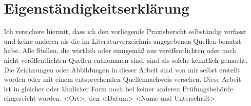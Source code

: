 \section{Eigenständigkeitserklärung}
Ich versichere hiermit, dass ich den vorliegende Praxisbericht selbständig verfasst
und keine anderen als die im Literaturverzeichnis angegebenen Quellen benutzt habe.
Alle Stellen, die wörtlich oder sinngemäß aus veröffentlichten oder noch nicht
veröffentlichten Quellen entnommen sind, sind als solche kenntlich gemacht. Die
Zeichnungen oder Abbildungen in dieser Arbeit sind von mir selbst erstellt worden
oder mit einem entsprechenden Quellennachweis versehen. Diese Arbeit ist in
gleicher oder ähnlicher Form noch bei keiner anderen Prüfungsbehörde eingereicht
worden.
<Ort>, den <Datum>
<Name und Unterschrift>
